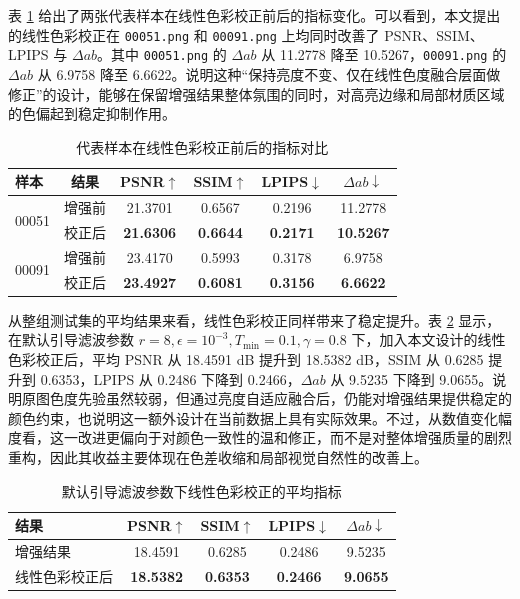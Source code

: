 \documentclass[10pt,twocolumn,letterpaper]{article}
\begin{document}
表 \ref{tab:ccb_selected} 给出了两张代表样本在线性色彩校正前后的指标变化。可以看到，本文提出的线性色彩校正在 \texttt{00051.png} 和 \texttt{00091.png} 上均同时改善了 PSNR、SSIM、LPIPS 与 $\Delta ab$。其中 \texttt{00051.png} 的 $\Delta ab$ 从 11.2778 降至 10.5267，\texttt{00091.png} 的 $\Delta ab$ 从 6.9758 降至 6.6622。说明这种“保持亮度不变、仅在线性色度融合层面做修正”的设计，能够在保留增强结果整体氛围的同时，对高亮边缘和局部材质区域的色偏起到稳定抑制作用。

\begin{table}[t]
    \centering
    \caption{代表样本在线性色彩校正前后的指标对比}
    \label{tab:ccb_selected}
    \begin{tabular}{lccccc}
        \toprule
        样本 & 结果 & PSNR$\uparrow$ & SSIM$\uparrow$ & LPIPS$\downarrow$ & $\Delta ab\downarrow$ \\
        \midrule
        \multirow{2}{*}{00051} & 增强前 & 21.3701 & 0.6567 & 0.2196 & 11.2778 \\
        & 校正后 & \textbf{21.6306} & \textbf{0.6644} & \textbf{0.2171} & \textbf{10.5267} \\
        \midrule
        \multirow{2}{*}{00091} & 增强前 & 23.4170 & 0.5993 & 0.3178 & 6.9758 \\
        & 校正后 & \textbf{23.4927} & \textbf{0.6081} & \textbf{0.3156} & \textbf{6.6622} \\
        \bottomrule
    \end{tabular}
\end{table}

从整组测试集的平均结果来看，线性色彩校正同样带来了稳定提升。表 \ref{tab:ccb_average} 显示，在默认引导滤波参数 $r=8,\epsilon=10^{-3},T_{\min}=0.1,\gamma=0.8$ 下，加入本文设计的线性色彩校正后，平均 PSNR 从 18.4591 dB 提升到 18.5382 dB，SSIM 从 0.6285 提升到 0.6353，LPIPS 从 0.2486 下降到 0.2466，$\Delta ab$ 从 9.5235 下降到 9.0655。说明原图色度先验虽然较弱，但通过亮度自适应融合后，仍能对增强结果提供稳定的颜色约束，也说明这一额外设计在当前数据上具有实际效果。不过，从数值变化幅度看，这一改进更偏向于对颜色一致性的温和修正，而不是对整体增强质量的剧烈重构，因此其收益主要体现在色差收缩和局部视觉自然性的改善上。

\begin{table}[t]
    \centering
    \caption{默认引导滤波参数下线性色彩校正的平均指标}
    \label{tab:ccb_average}
    \begin{tabular}{lcccc}
        \toprule
        结果 & PSNR$\uparrow$ & SSIM$\uparrow$ & LPIPS$\downarrow$ & $\Delta ab\downarrow$ \\
        \midrule
        增强结果 & 18.4591 & 0.6285 & 0.2486 & 9.5235 \\
        线性色彩校正后 & \textbf{18.5382} & \textbf{0.6353} & \textbf{0.2466} & \textbf{9.0655} \\
        \bottomrule
    \end{tabular}
\end{table}
\end{document}
